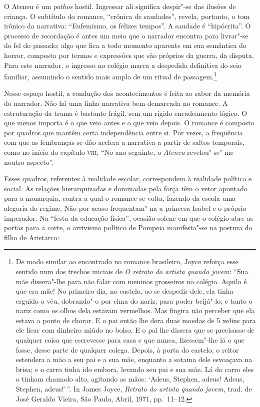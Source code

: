 O Ateneu é um \textit{pathos}
hostil. Ingressar ali significa despir"-se das ilusões de criança. O
subtítulo do romance, ``crônica de saudades'', revela, portanto, o tom
irônico da narrativa: ``Eufemismo, os felizes tempos''. A saudade é
``hipócrita''. O processo de recordação é antes um meio que o narrador
encontra para livrar"-se do fel do passado; algo que fica a todo
momento aparente em sua semântica do horror, composta por termos e
expressões que são próprios da guerra, da disputa. Para este narrador,
o ingresso no colégio marca a despedida definitiva do seio familiar,
assumindo o sentido mais amplo de um ritual de passagem.\footnote{ De
modo similar ao encontrado no romance brasileiro, Joyce reforça esse
sentido num dos trechos iniciais de \textit{O retrato do artista quando
jovem}: ``Sua mãe dissera"-lhe para não falar com meninos grosseiros no
colégio. Aquilo é que era mãe! No primeiro dia, no castelo, ao se
despedir dele, ela tinha erguido o véu, dobrando"-o por cima do nariz,
para poder beijá"-lo; e tanto o nariz como os olhos dela estavam
vermelhos. Mas fingira não perceber que ela estava a ponto de chorar. E
o pai então lhe dera duas moedas de 5 xelins para ele ficar com
dinheiro miúdo no bolso. E o pai lhe dissera que se precisasse de
qualquer coisa que escrevesse para casa e que nunca, fizessem"-lhe lá
o que fosse, desse parte de qualquer colega. Depois, à porta do
castelo, o reitor estendera a mão a seu pai e a sua mãe, enquanto a
sotaina dele esvoaçava na brisa; e o carro tinha ido embora, levando
seu pai e sua mãe. Lá do carro eles o tinham chamado alto, agitando as
mãos: `Adeus, Stephen, adeus! Adeus, Stephen, adeus!'\,''. In James
Joyce, \textit{Retrato do artista quando jovem}, trad. de José Geraldo
Vieira, São Paulo, Abril, 1971, pp.~11--12.}

Nesse espaço hostil, a condução dos acontecimentos é
feita ao sabor da memória do narrador. Não há uma linha narrativa bem
demarcada no romance. A estruturação da trama é bastante frágil, sem um
rígido encadeamento lógico. 
O que menos importa é o que veio antes e o que veio depois. O romance é composto
por quadros que mantêm certa independência entre si. Por vezes,
a frequência com que as lembranças se dão acelera a narrativa a partir
de saltos temporais, como no início do capítulo \textsc{viii}, ``No ano seguinte,
o \textit{Ateneu} revelou"-se"-me noutro aspecto''.

Esses quadros, referentes à realidade escolar, correspondem à realidade
política e social. As relações hierarquizadas e dominadas pela força
têm o vetor apontado para a monarquia, contra a qual o romance se
volta, fazendo da escola uma alegoria do regime. Não por acaso
frequentam"-na a princesa Isabel e o próprio imperador. Na ``festa da
educação física'', ocasião solene em que o colégio abre as portas para a
corte, o arrivismo político de Pompeia manifesta"-se na postura do
filho de Aristarco:


